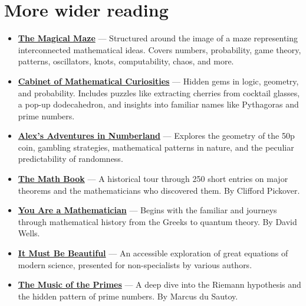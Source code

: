 \documentclass[11pt]{article}
\newif\ifshowpersonal
\newcommand{\personal}[1]{\ifshowpersonal\textcolor{myorange}{\emph{#1}}\fi}
\begin{document}
\appendix

\section{More wider reading}\label{sec:morebooks}

\personal{I think I might have flicked through a couple of these, but I don't think I seriously read any of them, so can't comment on how good they are!}

\begin{itemize}

\item \href{https://isbn.is/9780297819929}{\textbf{The Magical Maze}} — Structured around the image of a maze representing interconnected mathematical ideas. Covers numbers, probability, game theory, patterns, oscillators, knots, computability, chaos, and more.

\item \href{https://isbn.is/9781846680649}{\textbf{Cabinet of Mathematical Curiosities}} — Hidden gems in logic, geometry, and probability. Includes puzzles like extracting cherries from cocktail glasses, a pop-up dodecahedron, and insights into familiar names like Pythagoras and prime numbers.

\item \href{https://isbn.is/9780747597162}{\textbf{Alex's Adventures in Numberland}} — Explores the geometry of the 50p coin, gambling strategies, mathematical patterns in nature, and the peculiar predictability of randomness.

\item \href{https://isbn.is/9781402757969}{\textbf{The Math Book}} — A historical tour through 250 short entries on major theorems and the mathematicians who discovered them. By Clifford Pickover.

\item \href{https://isbn.is/014017480X}{\textbf{You Are a Mathematician}} — Begins with the familiar and journeys through mathematical history from the Greeks to quantum theory. By David Wells.

\item \href{https://isbn.is/1862075557}{\textbf{It Must Be Beautiful}} — An accessible exploration of great equations of modern science, presented for non-specialists by various authors.

\item \href{https://isbn.is/1841155802}{\textbf{The Music of the Primes}} — A deep dive into the Riemann hypothesis and the hidden pattern of prime numbers. By Marcus du Sautoy.


\end{itemize}
\end{document}
